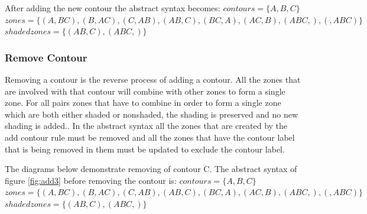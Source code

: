 \documentclass[a4paper]{article}
\begin{document}
After adding the new contour the abstract syntax becomes:\newline
$contours =  \lbrace A, B, C \rbrace $ \newline
$zones = \lbrace (A , BC) , (B , AC), (C, AB), (AB , C) , (BC , A) , (AC, B), (ABC , ), (  , ABC) \rbrace  $ \newline 
$shaded zones = \lbrace (AB , C), (ABC , ) \rbrace  $ \newline

\subsubsection{Remove Contour}
Removing a contour is the reverse process of adding a contour. All the zones that are involved with that contour will combine with other zones to form a single zone. For all pairs zones that have to combine in order to form a single zone which are both either shaded or nonshaded, the shading is preserved and no new shading is added.\cite{Fish_2007}. In the abstract syntax all the zones that are created by the add contour rule must be removed and all the zones that have the contour label that is being removed in them must be updated to exclude the contour label.

The diagrams below demonstrate removing of contour C. The abstract syntax of figure \ref{fig:add3} before removing the contour is:\newline
$contours =  \lbrace A, B, C \rbrace $ \newline
$zones = \lbrace (A , BC) , (B , AC), (C, AB), (AB , C) , (BC , A) , (AC, B), (ABC , ), (  , ABC) \rbrace  $ \newline 
$shaded zones = \lbrace (AB , C), (ABC , ) \rbrace  $ \newline
\end{document}
